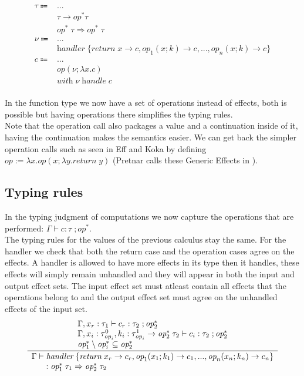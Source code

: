 \documentclass[12pt]{article}
\newcommand\eop[0]{\textit{op}}
\newcommand\eopa[0]{\textit{op}^*}
\newcommand\type[0]{\tau}
\newcommand\tarr[2]{#1 \rightarrow #2}
\newcommand\tarre[3]{#1 \rightarrow #2 \; #3}
\newcommand\thandler[4]{#1 \; #2 \Rightarrow #3 \; #4}
\newcommand\val[0]{\nu}
\newcommand\vabs[2]{\lambda #1 . #2}
\newcommand\vhandler[1]{\textit{handler} \; \{#1\}}
\newcommand\vhandlerc[0]{\vhandler{
	\textit{return} \; x \rightarrow \comp,
	\eop_1(x ; k) \rightarrow \comp,
	...,
	\eop_n(x ; k) \rightarrow \comp
}}
\newcommand\comp[0]{c}
\newcommand\creturn[1]{\textit{return} \; #1}
\newcommand\cop[4]{#1(#2 ; \lambda #3 . #4)}
\newcommand\chandle[2]{\textit{with} \; #1 \; \textit{handle} \; #2}
\begin{document}
\begin{align*}
	\type \Coloneqq 	& ...							\tag{types} \\
				& \tarr{\type}{\eopa}{\type}			\tag{type of functions}\\
				& \thandler{\eopa}{\type}{\eopa}{\type}	\tag{type of handlers} \\
	\val \Coloneqq	& ...							\tag{values} \\
				& \vhandlerc						\tag{handler} \\
	\comp \Coloneqq	& ...							\tag{computations} \\
				& \cop{\eop}{\val}{x}{\comp}			\tag{operation call} \\
				& \chandle{\val}{\comp}				\tag{handle computation} \\
\end{align*}

In the function type we now have a set of operations instead of effects, both is possible but having operations there simplifies the typing rules. \\
Note that the operation call also packages a value and a continuation inside of it, having the continuation makes the semantics easier.
We can get back the simpler operation calls such as seen in Eff and Koka by defining $\eop := \vabs{x}{\cop{\eop}{x}{y}{\creturn{y}}}$ (Pretnar calls these Generic Effects in \cite{pretnar}).

\subsection{Typing rules}
In the typing judgment of computations we now capture the operations that are performed: $\Gamma \vdash \comp : \type \; ; \eopa$. \\
The typing rules for the values of the previous calculus stay the same.
For the handler we check that both the return case and the operation cases agree on the effects.
A handler is allowed to have more effects in its type then it handles, these effects will simply
remain unhandled and they will appear in both the input and output effect sets.
The input effect set must atleast contain all effects that the operations belong to and the output effect set
must agree on the unhandled effects of the input set.
\[\frac{
	\begin{array}{l}
	\Gamma , x_r : \type_1 \vdash \comp_r : \type_2 \; ; \eopa_2 \\
	\Gamma , x_i : \type^0_{\eop_i} , k_i : \tarre{\type^1_{\eop_i}}{\eopa_2}{\type_2} \vdash \comp_i : \type_2 \; ; \eopa_2 \\
	\eopa_1 \setminus \eopa_i \subseteq \eopa_2 \\
	\end{array}
}{
	\begin{array}{l}
	\Gamma \vdash \vhandler{
		\textit{return} \; x_r \rightarrow \comp_r,
		\eop_1 ( x_1 ; k_1 ) \rightarrow \comp_1,
		...,
		\eop_n ( x_n ; k_n ) \rightarrow \comp_n
	} \\ \indent : \thandler{\eopa_1}{\type_1}{\eopa_2}{\type_2}
	\end{array}
}\]
\end{document}
